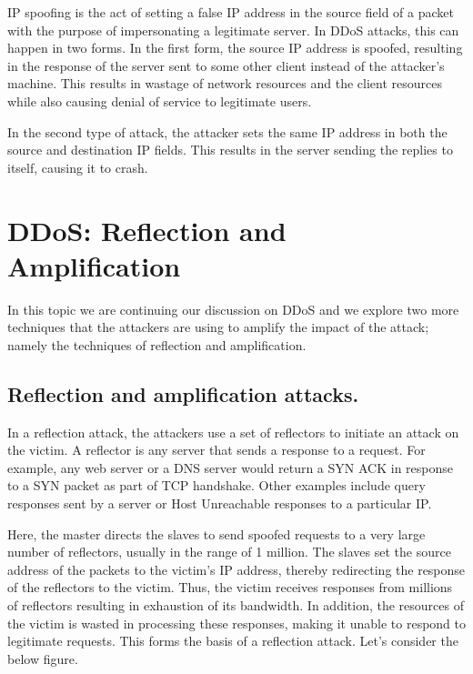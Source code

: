 \documentclass[11pt]{article}
\begin{document}
IP spoofing is the act of setting a false IP address in the source field of a packet with the purpose of impersonating a legitimate server. In DDoS attacks, this can happen in two forms. In the first form, the source IP address is spoofed, resulting in the response of the server sent to some other client instead of the attacker’s machine. This results in wastage of network resources and the client resources while also causing denial of service to legitimate users. 

In the second type of attack, the attacker sets the same IP address in both the source and destination IP fields. This results in the server sending the replies to itself, causing it to crash.

\section{DDoS: Reflection and Amplification}
\label{sec:orgaba95c5}

In this topic we are continuing our discussion on DDoS and we explore two more techniques that the attackers are using to amplify the impact of the attack; namely the techniques of reflection and amplification.



\subsection{Reflection and amplification attacks.}
\label{sec:orgd785d03}

In a reflection attack, the attackers use a set of reflectors to initiate an attack on the victim. A reflector is any server that sends a response to a request. For example, any web server or a DNS server would return a SYN ACK in response to a SYN packet as part of TCP handshake. Other examples include query responses sent by a server or Host Unreachable responses to a particular IP. 

Here, the master directs the slaves to send spoofed requests to a very large number of reflectors, usually in the range of 1 million. The slaves set the source address of the packets to the victim’s IP address, thereby redirecting the response of the reflectors to the victim. Thus, the victim receives responses from millions of reflectors resulting in exhaustion of its bandwidth. In addition, the resources of the victim is wasted in processing these responses, making it unable to respond to legitimate requests. This forms the basis of a reflection attack. Let’s consider the below figure.
\end{document}
